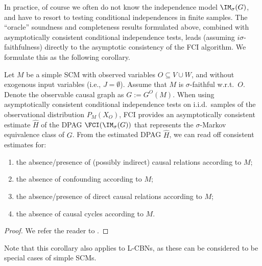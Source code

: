 In practice, of course we often do not know the independence model $\IM_\sigma(G)$, and have to resort to testing conditional independences in finite samples.
The ``oracle'' soundness and completeness results formulated above, combined with asymptotically consistent conditional independence tests, leads (assuming $i\sigma$-faithfulness) directly to the asymptotic consistency of the FCI algorithm.
We formulate this as the following corollary.
\begin{Cor}
  Let $M$ be a simple SCM with observed variables $O \subseteq V \cup W$, and without exogenous input variables (i.e., $J = \emptyset$).
  Assume that $M$ is $\sigma$-faithful w.r.t.\ $O$.
  Denote the observable causal graph as $G := G^O(M)$.
  When using asymptotically consistent conditional independence tests on i.i.d.\ samples of the observational distribution $P_{M}(X_O)$, FCI provides an asymptotically consistent estimate $\hat{H}$ of the DPAG $\FCI(\IM_\sigma(G))$ that represents the $\sigma$-Markov equivalence class of $G$. From the estimated DPAG $\hat{H}$, we can read off consistent estimates for:
  \begin{enumerate}[label=(\roman*)]
  \item the absence/presence of (possibly indirect) causal relations according to $M$; 
  \item the absence of confounding according to $M$;
  \item the absence/presence of direct causal relations according to $M$;
  \item the absence of causal cycles according to $M$.
  \end{enumerate}
\end{Cor}
\begin{proof}
  We refer the reader to \cite{MooijClaassen_UAI_20}.
\end{proof}
Note that this corollary also applies to L-CBNs, as these can be considered to be special cases of simple SCMs.


